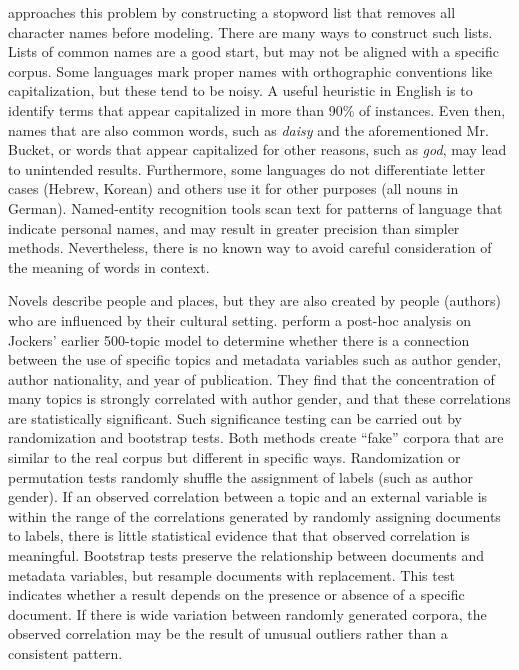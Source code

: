\citet{jockers-13} approaches this problem by constructing a stopword list that removes all character names before modeling.
There are many ways to construct such lists.
Lists of common names are a good start, but may not be aligned with a specific corpus.
Some languages mark proper names with orthographic conventions like capitalization, but these tend to be noisy.
A useful heuristic in English is to identify terms that appear capitalized in more than 90\% of instances.
Even then, names that are also common words, such as {\em daisy} and the aforementioned Mr. Bucket, or words that appear capitalized for other reasons, such as {\em god}, may lead to unintended results.
Furthermore, some languages do not differentiate letter cases (Hebrew, Korean) and others use it for other purposes (all nouns in German).
Named-entity recognition tools scan text for patterns of language that indicate personal names, and may result in greater precision than simpler methods.
Nevertheless, there is no known way to avoid careful consideration of the meaning of words in context.

Novels describe people and places, but they are also created by people (authors) who are influenced by their cultural setting.
\citet{jockers-13b} perform a post-hoc analysis on Jockers' earlier 500-topic model to determine whether there is a connection between the use of specific topics and metadata variables such as author gender, author nationality, and year of publication.
They find that the concentration of many topics is strongly correlated with author gender, and that these correlations are statistically significant.
Such significance testing can be carried out by randomization and bootstrap tests.
Both methods create ``fake'' corpora that are similar to the real corpus but different in specific ways.
Randomization or permutation tests randomly shuffle the assignment of labels (such as author gender). If an observed correlation between a topic and an external variable is within the range of the correlations generated by randomly assigning documents to labels, there is little statistical evidence that that observed correlation is meaningful.
Bootstrap tests preserve the relationship between documents and metadata variables, but resample documents with replacement.
This test indicates whether a result depends on the presence or absence of a specific document.
If there is wide variation between randomly generated corpora, the observed correlation may be the result of unusual outliers rather than a consistent pattern.

